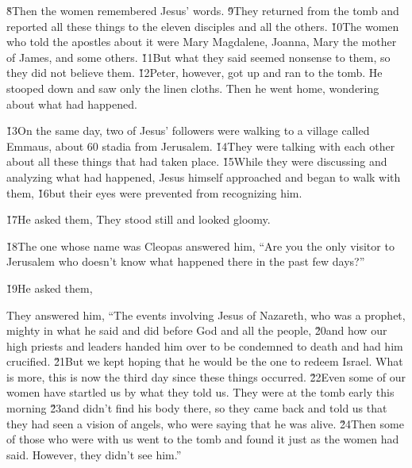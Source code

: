 \v{8}Then the women remembered Jesus' words. \v{9}They returned from the tomb and reported all these things to the eleven disciples and all the others. \v{10}The women who told the apostles about it were Mary Magdalene, Joanna, Mary the mother of James, and some others. \v{11}But what they said seemed nonsense to them, so they did not believe them. \v{12}Peter, however, got up and ran to the tomb. He stooped down and saw only the linen cloths. Then he went home, wondering about what had happened.

\v{13}On the same day, two of Jesus' followers were walking to a village called Emmaus, about 60 stadia from Jerusalem. \v{14}They were talking with each other about all these things that had taken place. \v{15}While they were discussing and analyzing what had happened, Jesus himself approached and began to walk with them, \v{16}but their eyes were prevented from recognizing him.

\v{17}He asked them,  They stood still and looked gloomy.

\v{18}The one whose name was Cleopas answered him, ``Are you the only visitor to Jerusalem who doesn't know what happened there in the past few days?''

\v{19}He asked them, 

They answered him, ``The events involving Jesus of Nazareth, who was a prophet, mighty in what he said and did before God and all the people, \v{20}and how our high priests and leaders handed him over to be condemned to death and had him crucified. \v{21}But we kept hoping that he would be the one to redeem Israel. What is more, this is now the third day since these things occurred. \v{22}Even some of our women have startled us by what they told us. They were at the tomb early this morning \v{23}and didn't find his body there, so they came back and told us that they had seen a vision of angels, who were saying that he was alive. \v{24}Then some of those who were with us went to the tomb and found it just as the women had said. However, they didn't see him.''


